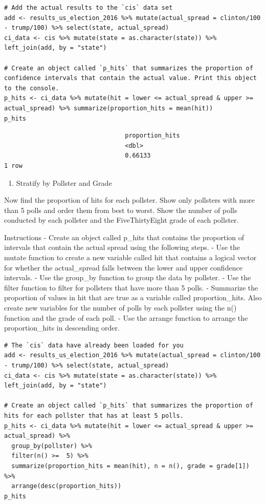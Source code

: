 \documentclass[
]{article}
\providecommand{\tightlist}{%
  \setlength{\itemsep}{0pt}\setlength{\parskip}{0pt}}
\begin{document}
\begin{verbatim}
# Add the actual results to the `cis` data set
add <- results_us_election_2016 %>% mutate(actual_spread = clinton/100 - trump/100) %>% select(state, actual_spread)
ci_data <- cis %>% mutate(state = as.character(state)) %>% left_join(add, by = "state")

# Create an object called `p_hits` that summarizes the proportion of confidence intervals that contain the actual value. Print this object to the console.
p_hits <- ci_data %>% mutate(hit = lower <= actual_spread & upper >= actual_spread) %>% summarize(proportion_hits = mean(hit))
p_hits
\end{verbatim}

\begin{verbatim}
                                 proportion_hits
                                 <dbl>
                                 0.66133
1 row
\end{verbatim}

\begin{enumerate}
\def\labelenumi{\arabic{enumi}.}
\setcounter{enumi}{2}
\tightlist
\item
  Stratify by Pollster and Grade
\end{enumerate}

Now find the proportion of hits for each pollster. Show only pollsters
with more than 5 polls and order them from best to worst. Show the
number of polls conducted by each pollster and the FiveThirtyEight grade
of each pollster.

Instructions - Create an object called p\_hits that contains the
proportion of intervals that contain the actual spread using the
following steps. - Use the mutate function to create a new variable
called hit that contains a logical vector for whether the actual\_spread
falls between the lower and upper confidence intervals. - Use the
group\_by function to group the data by pollster. - Use the filter
function to filter for pollsters that have more than 5 polls. -
Summarize the proportion of values in hit that are true as a variable
called proportion\_hits. Also create new variables for the number of
polls by each pollster using the n() function and the grade of each
poll. - Use the arrange function to arrange the proportion\_hits in
descending order.

\begin{verbatim}
# The `cis` data have already been loaded for you
add <- results_us_election_2016 %>% mutate(actual_spread = clinton/100 - trump/100) %>% select(state, actual_spread)
ci_data <- cis %>% mutate(state = as.character(state)) %>% left_join(add, by = "state")

# Create an object called `p_hits` that summarizes the proportion of hits for each pollster that has at least 5 polls. 
p_hits <- ci_data %>% mutate(hit = lower <= actual_spread & upper >= actual_spread) %>% 
  group_by(pollster) %>%
  filter(n() >=  5) %>%
  summarize(proportion_hits = mean(hit), n = n(), grade = grade[1]) %>%
  arrange(desc(proportion_hits))
p_hits
\end{verbatim}
\end{document}
